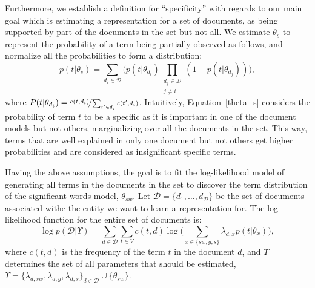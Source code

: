 Furthermore, we establish a definition for ``specificity'' with regards to our main goal which is estimating a representation for a set of documents, as being supported by part of the documents in the set but not all. We estimate $\theta_s$ to represent the probability of a term being partially observed as follows, and normalize all the probabilities to form a distribution:
\begin{equation}
p(t|\theta_s) = 
\sum_{d_i\in \mathcal{D}} 
\bigg(
p(t|\theta_{d_i}) \prod_{\substack{d_j\in \mathcal{D} \\ j \neq i}} (1-p(t|\theta_{d_j}))
\bigg),
\label{theta_s}
\end{equation}
where $P(t|\theta_{d_i}) = \nicefrac{c(t,d_i)}{\sum_{t' \in d_i} c(t',d_i)}$. 
Intuitively, Equation~\ref{theta_s} considers the probability of term $t$ to be a specific as it is important in one of the document models but not others, marginalizing over all the documents in the set. This way, terms that are well explained in only one document but not others get higher probabilities and are considered as insignificant specific terms.

Having the above assumptions, the goal is to fit the log-likelihood model of generating all terms in the documents in the set to discover the term distribution of the significant words model, $\theta_{sw}$. 
Let $\mathcal{D} = \{d_1, \ldots, d_{\mathcal{D}}\}$ be the set of documents associated withe the entity we want to learn a representation for. The log-likelihood function for the entire set of documents is:
\begin{equation}
\log p(\mathcal{D}|\Upsilon) = \sum_{d \in \mathcal{D}}\sum_{t \in V} c(t,d) \log \big(\sum_{x\in\{sw,g,s\}}\lambda_{d,x} p(t|\theta_x)\big),
\end{equation}
where $c(t,d)$ is the frequency of the term $t$ in the document $d$, and $\Upsilon$ determines the set of all parameters that should be estimated, $\Upsilon =\{\lambda_{d,sw}, \lambda_{d,g}, \lambda_{d,s} \}_{d \in \mathcal{D}} \cup \{\theta_{sw}\}$. 

